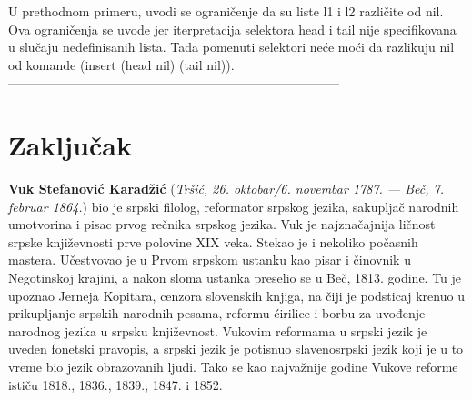 \documentclass[12pt,oneside]{memoir}
\begin{document}
U prethodnom primeru, uvodi se ograničenje da su liste l1 i l2 različite od nil. Ova ograničenja se uvode jer iterpretacija selektora head i tail 
nije specifikovana u slučaju nedefinisanih lista.
Tada pomenuti selektori neće moći da razlikuju nil od komande (insert (head nil) (tail nil)).
------------------------------------------------------------------------------



\chapter{Zaključak}


\literatura

\backmatter

\begin{biografija}
  \textbf{Vuk Stefanović Karadžić} (\emph{Tršić,
    26. oktobar/6. novembar 1787. — Beč, 7. februar 1864.}) bio je
  srpski filolog, reformator srpskog jezika, sakupljač narodnih
  umotvorina i pisac prvog rečnika srpskog jezika.  Vuk je
  najznačajnija ličnost srpske književnosti prve polovine XIX
  veka. Stekao je i nekoliko počasnih mastera.  Učestvovao je u
  Prvom srpskom ustanku kao pisar i činovnik u Negotinskoj krajini, a
  nakon sloma ustanka preselio se u Beč, 1813. godine. Tu je upoznao
  Jerneja Kopitara, cenzora slovenskih knjiga, na čiji je podsticaj
  krenuo u prikupljanje srpskih narodnih pesama, reformu ćirilice i
  borbu za uvođenje narodnog jezika u srpsku književnost. Vukovim
  reformama u srpski jezik je uveden fonetski pravopis, a srpski jezik
  je potisnuo slavenosrpski jezik koji je u to vreme bio jezik
  obrazovanih ljudi. Tako se kao najvažnije godine Vukove reforme
  ističu 1818., 1836., 1839., 1847. i 1852.
\end{biografija}
\end{document}
